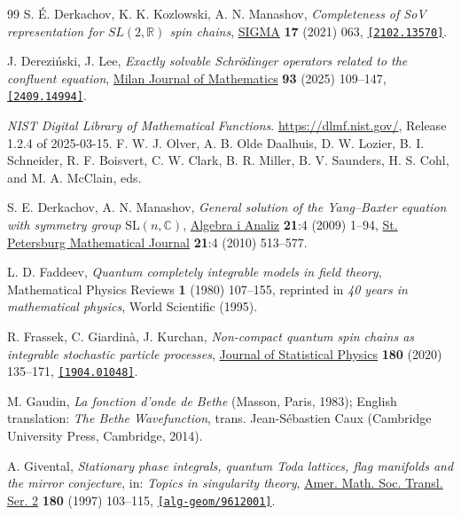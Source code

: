 \documentclass[11pt]{article}
\numberwithin{equation}{section}
\theoremstyle{plain}
\theoremstyle{definition}
\begin{document}
\begin{thebibliography}{99}
	 S. \'E. Derkachov, K. K. Kozlowski, A. N. Manashov, \textit{Completeness of SoV representation for $SL (2, \mathbb{R})$ spin chains}, \href{https://doi.org/10.3842/SIGMA.2021.063}{SIGMA} \textbf{17} (2021) 063, \href{https://doi.org/10.48550/arXiv.2102.13570}{\tt [2102.13570]}.
	
	 J. Derezi\'nski, J. Lee, \textit{Exactly solvable Schrödinger operators related to the confluent equation}, \href{https://doi.org/10.1007/s00032-025-00414-2}{Milan Journal of Mathematics} \textbf{93} (2025) 109--147, \href{https://doi.org/10.48550/arXiv.2409.14994}{\tt [2409.14994]}.

	 \textit{NIST Digital Library of Mathematical Functions}. \href{https://dlmf.nist.gov/}{https://dlmf.nist.gov/}, Release 1.2.4 of 2025-03-15. F. W. J. Olver, A. B. Olde Daalhuis, D. W. Lozier, B. I. Schneider, R. F. Boisvert, C. W. Clark, B. R. Miller, B. V. Saunders, H. S. Cohl, and M. A. McClain, eds.

	 S. E. Derkachov, A. N. Manashov, \textit{General solution of the Yang–Baxter equation with symmetry group $\mathrm{SL}(n,\mathbb{C})$}, \href{https://www.mathnet.ru/rus/aa1145}{Algebra i Analiz} \textbf{21}:4 (2009) 1--94, \href{https://doi.org/10.1090/S1061-0022-2010-01106-3}{St. Petersburg Mathematical Journal} \textbf{21}:4 (2010) 513--577.
	
	 L. D. Faddeev, \textit{Quantum completely integrable models in field theory}, Mathematical Physics Reviews \textbf{1} (1980) 107--155, reprinted in \textit{40 years in mathematical physics}, World Scientific (1995).
	
	 R. Frassek, C. Giardin\`a, J. Kurchan, \textit{Non-compact quantum spin chains as integrable stochastic particle processes}, \href{https://doi.org/10.1007/s10955-019-02375-4}{Journal of Statistical Physics} \textbf{180} (2020) 135--171, \href{https://doi.org/10.48550/arXiv.1904.01048}{\tt [1904.01048]}.
	
	 M. Gaudin, \textit{La fonction d'onde de Bethe} (Masson, Paris, 1983); English translation: \textit{The Bethe Wavefunction}, trans. Jean-Sébastien Caux (Cambridge University Press, Cambridge, 2014).
	
	 A. Givental, \textit{Stationary phase integrals, quantum Toda lattices, flag manifolds and the mirror conjecture}, in: \textit{Topics in singularity theory}, \href{https://doi.org/10.1090/trans2/180}{Amer. Math. Soc. Transl. Ser. 2} \textbf{180} (1997) 103--115, \href{https://doi.org/10.48550/arXiv.alg-geom/9612001}{\tt [alg-geom/9612001]}.
	

\end{thebibliography}
\end{document}
